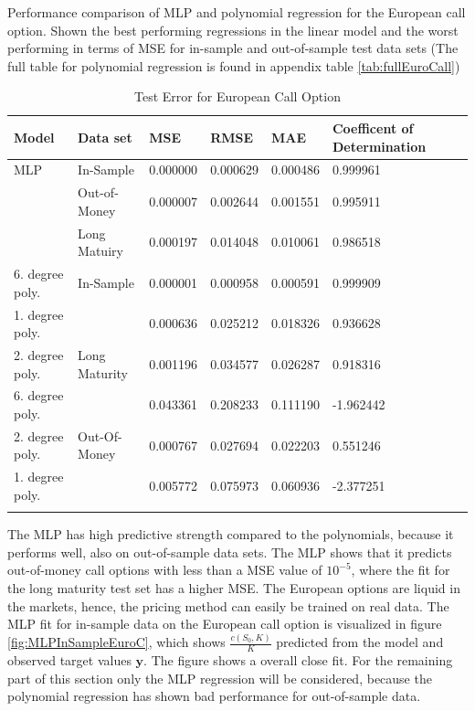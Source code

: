 \begin{table}[H]
\caption{Test Error for European Call Option}{Performance comparison of MLP and polynomial regression for the European call option. Shown the best performing regressions in the linear model and the worst performing in terms of MSE for in-sample and out-of-sample test data sets (The full table for polynomial regression is found in appendix table \ref{tab:fullEuroCall})}
\label{tab:ComparePolyWithMLP}
\centering
\begin{tabular}{l l l l l l l }
\toprule
\textbf{Model} & \textbf{Data set} & \textbf{MSE} & \textbf{RMSE} & \textbf{MAE} & \textbf{Coefficent of Determination} \\
\midrule
MLP & In-Sample & 0.000000 & 0.000629 & 0.000486 & 0.999961\\
& Out-of-Money & 0.000007 & 0.002644 & 0.001551 & 0.995911\\
& Long Matuiry & 0.000197 & 0.014048 & 0.010061 & 0.986518\\
6. degree poly. & In-Sample & 0.000001 & 0.000958 & 0.000591 & 0.999909\\
1. degree poly. &  & 0.000636 & 0.025212 & 0.018326 & 0.936628\\
2. degree poly. & Long Maturity & 0.001196 & 0.034577 & 0.026287 & 0.918316\\
6. degree poly. &  & 0.043361 & 0.208233 & 0.111190 & -1.962442\\
2. degree poly. & Out-Of-Money & 0.000767 & 0.027694 & 0.022203 & 0.551246\\
1. degree poly. &  & 0.005772 & 0.075973 & 0.060936 & -2.377251\\
\bottomrule\\
\end{tabular}
\end{table}

The MLP has high predictive strength compared to the polynomials, because it performs well, also on out-of-sample data sets. The MLP shows that it predicts out-of-money call options with less than a MSE value of $10^{-5}$, where the fit for the long maturity test set has a higher MSE. The European options are liquid in the markets, hence, the pricing method can easily be trained on real data. The MLP fit for in-sample data on the European call option is visualized in figure \ref{fig:MLPInSampleEuroC}, which shows $\frac{c(S_0,K)}{K}$ predicted from the model and observed target values $\bm{y}$. The figure shows a overall close fit. For the remaining part of this section only the MLP regression will be considered, because the polynomial regression has shown bad performance for out-of-sample data.


